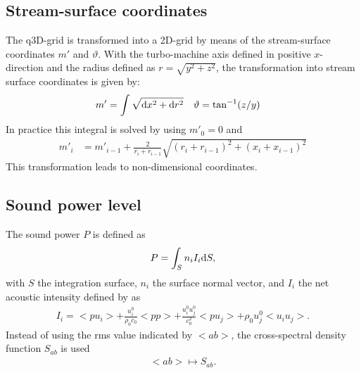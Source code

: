 \subsection{Stream-surface coordinates}
\label{app:mtheta}
The q3D-grid is transformed into a 2D-grid by means of the stream-surface coordinates $m'$ and $\vartheta$.
With the turbo-machine axis defined in positive $x$-direction and the radius defined as $r = \sqrt{y^2+z^2}$, the transformation into stream surface coordinates is given by:
\begin{align}
m' &= \int \sqrt{\text{d} x^2 +\text{d} r^2} & \vartheta &= \tan^{-1}(z/y)
\end{align}
In practice this integral is solved by using $m'_0 = 0$ and 
\begin{align}
m'_i &= m'_{i-1} + \frac{2}{r_i+r_{i-1}}
	\sqrt{(r_i+r_{i-1})^2+(x_i+x_{i-1})^2}
\end{align}
This transformation leads to non-dimensional coordinates. 

\subsection{Sound power level}
\label{sec:PWL}
The sound power $P$ is defined as
\begin{align}
P = \int_S n_i I_i \text{d} S,
\end{align}
with $S$ the integration surface, $n_i$ the surface normal vector, and $I_i$ the net acoustic intensity defined by \citet{Morfey_Sound_1971} as
\begin{align}
I_i = <pu_i> + \frac{u^0_i }{\rho_0 c_0} <pp> + \frac{u^0_i u^0_j}{c_0^2} <pu_j> + \rho_0 u^0_j <u_i u_j >.
\end{align}
Instead of using the rms value indicated by $<ab>$, the cross-spectral density function $S_{ab}$ is used
\begin{align}
<ab> \mapsto  S_{ab}.
\end{align}

